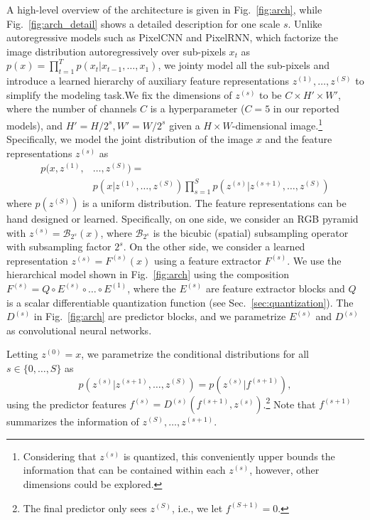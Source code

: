 \documentclass[10pt,twocolumn,letterpaper]{article}
\newcommand{\Bicubic}{\mathcal{B}}
\newcommand{\fs}[1]{f^{(#1)}}
\begin{document}
A high-level overview of the architecture is given in Fig.~\ref{fig:arch}, while Fig.~\ref{fig:arch_detail} shows a detailed description for one scale $s$.
Unlike autoregressive models such as PixelCNN and PixelRNN, which factorize the image distribution autoregressively over sub-pixels $x_t$ as $p(x) = \prod_{t=1}^T p(x_t|x_{t-1}, \ldots, x_1)$, we jointy model all the sub-pixels and introduce a learned hierarchy of auxiliary feature representations $z^{(1)}, \ldots, z^{(S)}$ to simplify the modeling task.We fix the dimensions of $z^{(s)}$ to be $C{\times}H'{\times}W'$, where the number of channels $C$ is a hyperparameter ($C=5$ in our reported models), and $H'=H/2^s, W'=W/2^s$ given a $H{\times}W$-dimensional image.\footnote{Considering that $z^{(s)}$ is quantized, this conveniently upper bounds the information that can be contained within each $z^{(s)}$, however, other dimensions could be explored.}
Specifically, we model the joint distribution of the image $x$ and the feature representations $z^{(s)}$ as
\begin{align*}
    p(x, z^{(1)}, &\ldots, z^{(S)}) = \\[-2ex]
    &p(x|z^{(1)}, \ldots, z^{(S)}) \prod_{s=1}^{S} p(z^{(s)}|z^{(s+1)}, \ldots, z^{(S)})
\end{align*}
where $p(z^{(S)})$ is a uniform distribution. The feature representations can be hand designed or learned. Specifically, on one side, we consider an RGB pyramid with $z^{(s)}=\Bicubic_{2^s}(x)$, where $\Bicubic_{2^s}$ is the bicubic (spatial) subsampling operator with subsampling factor $2^s$. On the other side, we consider a learned representation $z^{(s)}=F^{(s)}(x)$ using a feature extractor $F^{(s)}$. We use the hierarchical model shown in Fig.~\ref{fig:arch} using the composition 
$F^{(s)} = Q \circ E^{(s)} \circ \dots \circ E^{(1)}$,
where the $E^{(s)}$ are feature extractor blocks and $Q$ is a scalar differentiable quantization function (see Sec.~\ref{sec:quantization}). The $D^{(s)}$ in Fig.~\ref{fig:arch} are predictor blocks, and we parametrize $E^{(s)}$ and $D^{(s)}$ as convolutional neural networks. 

Letting $z^{(0)} = x$,
we parametrize the conditional distributions  
for all $s \in \{0, \dots, S \}$ as
\begin{equation*}
    p(z^{(s)}|z^{(s+1)}, \ldots, z^{(S)}) = p(z^{(s)}|f^{(s+1)}) \label{eq:p_cond_param},
\end{equation*}
using the predictor features
$    f^{(s)}=D^{(s)}(\fs{s+1}, z^{(s)})$.\footnote{
            The final predictor only sees $z^{(S)}$, i.e., we let $\fs{S+1} = 0$.}
Note that $\fs{s+1}$ summarizes the information of $z^{(S)}, \dots, z^{(s+1)}$. 
\end{document}
